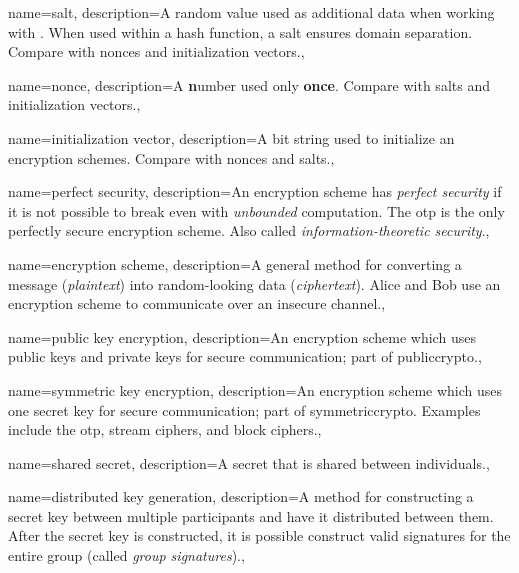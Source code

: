 
{
    name={salt},
    description={A random value used as additional data when working
        with .
        When used within a \gls{hash function}, a salt ensures
        domain separation.
        Compare with \glspl{nonce} and \glspl{initialization vector}.},
}

{
    name={nonce},
    description={A \textbf{n}umber used only \textbf{once}.
        Compare with \glspl{salt} and \glspl{initialization vector}.},
}

{
    name={initialization vector},
    description={A bit string used to initialize an
        \glspl{encryption scheme}.
        Compare with \glspl{nonce} and \glspl{salt}.},
}

{
    name={perfect security},
    description={An \gls{encryption scheme} has \emph{perfect security}
        if it is not possible
        to break even with \emph{unbounded} computation.
        The \gls{otp} is the only perfectly secure \gls{encryption scheme}.
        Also called \emph{information-theoretic security}.},
}

{
    name={encryption scheme},
    description={A general method for converting a message (\emph{plaintext})
        into random-looking data (\emph{ciphertext}).
        Alice and Bob use an encryption scheme to communicate
        over an \gls{insecure channel}.},
}

{
    name={public key encryption},
    description={An \gls{encryption scheme} which uses public keys
        and private keys for secure communication; part of \gls{publiccrypto}.},
}

{
    name={symmetric key encryption},
    description={An \gls{encryption scheme} which uses one secret key
        for secure communication; part of \gls{symmetriccrypto}.
        Examples include the \gls{otp}, \glspl{stream cipher},
        and \glspl{block cipher}.},
}

{
    name={shared secret},
    description={A secret that is shared between individuals.},
}

{
    name={distributed key generation},
    description={A method for constructing a secret key between multiple
        participants and have it distributed between them.
        After the secret key is constructed, it is possible construct
        valid \glspl{signature} for the entire group
        (called \emph{group signatures}).},
}

